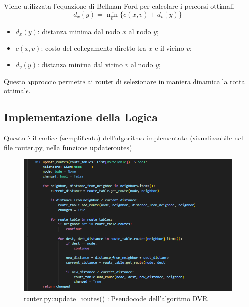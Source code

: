 \documentclass[a4paper,12pt]{report}
\begin{document}
\noindent Viene utilizzata l'equazione di Bellman-Ford per calcolare i percorsi ottimali
\[ d_x(y) = \min_v\{c(x,v) + d_v(y)\} \]
\begin{itemize}
    \item $d_x(y)$: distanza minima dal nodo $x$ al nodo $y$;
    \item $c(x,v)$: costo del collegamento diretto tra $x$ e il vicino $v$;
    \item $d_v(y)$: distanza minima dal vicino $v$ al nodo $y$;
\end{itemize}

\noindent Questo approccio permette ai router di selezionare in maniera dinamica la rotta ottimale.
\newpage
\subsection{Implementazione della Logica}
Questo è il codice (semplificato) dell'algoritmo implementato (visualizzabile nel file router.py, nella funzione updateroutes)

\begin{figure}[H] %
    \centering
    \includegraphics[width=\textwidth]{pseudocode.PNG}
    \caption{router.py::update\_routes() : Pseudocode dell'algoritmo DVR}
    \label{fig:pseudocode.PNG}
\end{figure}
\end{document}
